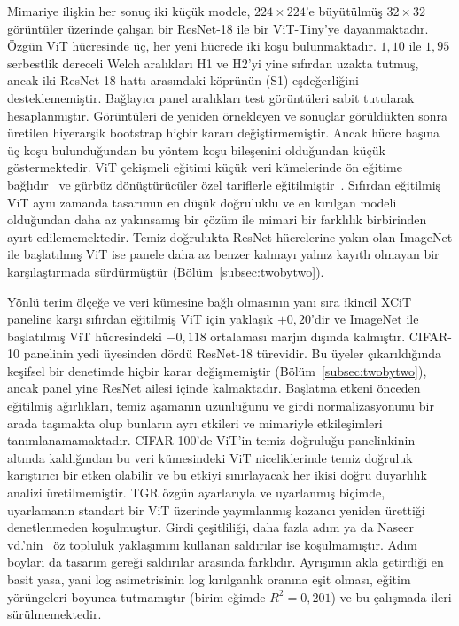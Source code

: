 Mimariye ilişkin her sonuç iki küçük modele, $224\times224$'e büyütülmüş $32\times32$ görüntüler üzerinde çalışan bir ResNet-18 ile bir ViT-Tiny'ye dayanmaktadır. Özgün ViT hücresinde üç, her yeni hücrede iki koşu bulunmaktadır. $1{,}10$ ile $1{,}95$ serbestlik dereceli Welch aralıkları H1 ve H2'yi yine sıfırdan uzakta tutmuş, ancak iki ResNet-18 hattı arasındaki köprünün (S1) eşdeğerliğini desteklememiştir. Bağlayıcı panel aralıkları test görüntüleri sabit tutularak hesaplanmıştır. Görüntüleri de yeniden örnekleyen ve sonuçlar görüldükten sonra üretilen hiyerarşik bootstrap hiçbir kararı değiştirmemiştir. Ancak hücre başına üç koşu bulunduğundan bu yöntem koşu bileşenini olduğundan küçük göstermektedir. ViT çekişmeli eğitimi küçük veri kümelerinde ön eğitime bağlıdır~\cite{mo2022adversarial} ve gürbüz dönüştürücüler özel tariflerle eğitilmiştir~\cite{debenedetti2023light}. Sıfırdan eğitilmiş ViT aynı zamanda tasarımın en düşük doğruluklu ve en kırılgan modeli olduğundan daha az yakınsamış bir çözüm ile mimari bir farklılık birbirinden ayırt edilememektedir. Temiz doğrulukta ResNet hücrelerine yakın olan ImageNet ile başlatılmış ViT ise panele daha az benzer kalmayı yalnız kayıtlı olmayan bir karşılaştırmada sürdürmüştür (Bölüm~\ref{subsec:twobytwo}).

Yönlü terim ölçeğe ve veri kümesine bağlı olmasının yanı sıra ikincil XCiT paneline karşı sıfırdan eğitilmiş ViT için yaklaşık $+0{,}20$'dir ve ImageNet ile başlatılmış ViT hücresindeki $-0{,}118$ ortalaması marjın dışında kalmıştır. CIFAR-10 panelinin yedi üyesinden dördü ResNet-18 türevidir. Bu üyeler çıkarıldığında keşifsel bir denetimde hiçbir karar değişmemiştir (Bölüm~\ref{subsec:twobytwo}), ancak panel yine ResNet ailesi içinde kalmaktadır. Başlatma etkeni önceden eğitilmiş ağırlıkları, temiz aşamanın uzunluğunu ve girdi normalizasyonunu bir arada taşımakta olup bunların ayrı etkileri ve mimariyle etkileşimleri tanımlanamamaktadır. CIFAR-100'de ViT'in temiz doğruluğu panelinkinin altında kaldığından bu veri kümesindeki ViT niceliklerinde temiz doğruluk karıştırıcı bir etken olabilir ve bu etkiyi sınırlayacak her ikisi doğru duyarlılık analizi üretilmemiştir. TGR özgün ayarlarıyla ve uyarlanmış biçimde, uyarlamanın standart bir ViT üzerinde yayımlanmış kazancı yeniden ürettiği denetlenmeden koşulmuştur. Girdi çeşitliliği, daha fazla adım ya da Naseer vd.'nin~\cite{naseer2022improving} öz topluluk yaklaşımını kullanan saldırılar ise koşulmamıştır. Adım boyları da tasarım gereği saldırılar arasında farklıdır. Ayrışımın akla getirdiği en basit yasa, yani log asimetrisinin log kırılganlık oranına eşit olması, eğitim yörüngeleri boyunca tutmamıştır (birim eğimde $R^2 = 0{,}201$) ve bu çalışmada ileri sürülmemektedir.

